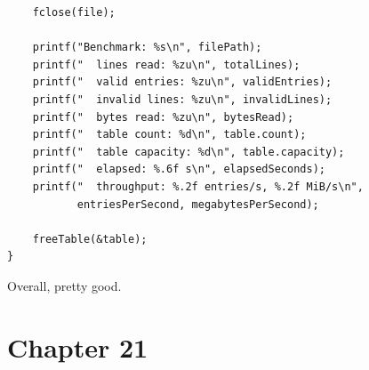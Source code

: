 \documentclass{article}
\begin{document}
\begin{enumerate}
{\begin{verbatim}
    fclose(file);

    printf("Benchmark: %s\n", filePath);
    printf("  lines read: %zu\n", totalLines);
    printf("  valid entries: %zu\n", validEntries);
    printf("  invalid lines: %zu\n", invalidLines);
    printf("  bytes read: %zu\n", bytesRead);
    printf("  table count: %d\n", table.count);
    printf("  table capacity: %d\n", table.capacity);
    printf("  elapsed: %.6f s\n", elapsedSeconds);
    printf("  throughput: %.2f entries/s, %.2f MiB/s\n",
           entriesPerSecond, megabytesPerSecond);

    freeTable(&table);
}
        \end{verbatim}
        Overall, pretty good.
    }
\end{enumerate}

\section*{Chapter 21}
\end{document}
